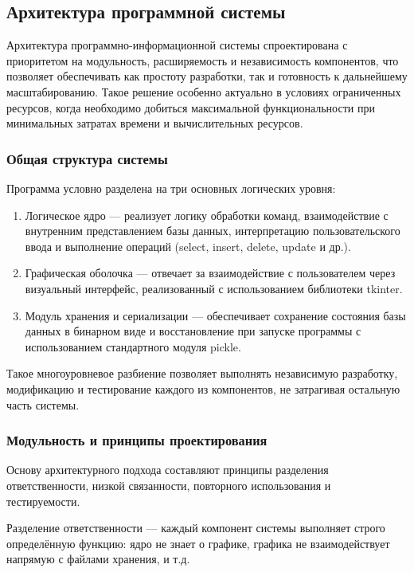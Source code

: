 \subsection{Архитектура программной системы}

Архитектура программно-информационной системы спроектирована с приоритетом на модульность, расширяемость и независимость компонентов, что позволяет обеспечивать как простоту разработки, так и готовность к дальнейшему масштабированию. Такое решение особенно актуально в условиях ограниченных ресурсов, когда необходимо добиться максимальной функциональности при минимальных затратах времени и вычислительных ресурсов.

\subsubsection{Общая структура системы}

Программа условно разделена на три основных логических уровня:
\begin{enumerate}
	\item Логическое ядро — реализует логику обработки команд, взаимодействие с внутренним представлением базы данных, интерпретацию пользовательского ввода и выполнение операций (select, insert, delete, update и др.).
	\item Графическая оболочка — отвечает за взаимодействие с пользователем через визуальный интерфейс, реализованный с использованием библиотеки tkinter.
	\item Модуль хранения и сериализации — обеспечивает сохранение состояния базы данных в бинарном виде и восстановление при запуске программы с использованием стандартного модуля pickle.
\end{enumerate}

Такое многоуровневое разбиение позволяет выполнять независимую разработку, модификацию и тестирование каждого из компонентов, не затрагивая остальную часть системы.

\subsubsection{Модульность и принципы проектирования}

Основу архитектурного подхода составляют принципы разделения ответственности, низкой связанности, повторного использования и тестируемости.

Разделение ответственности — каждый компонент системы выполняет строго определённую функцию: ядро не знает о графике, графика не взаимодействует напрямую с файлами хранения, и т.д.

